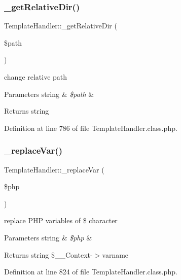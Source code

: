 \subsubsection{\texorpdfstring{\+\_\+get\+Relative\+Dir()}{\_getRelativeDir()}}
{\footnotesize\ttfamily Template\+Handler\+::\+\_\+get\+Relative\+Dir (\begin{DoxyParamCaption}\item[{}]{\$path }\end{DoxyParamCaption})}

change relative path 
\begin{DoxyParams}[1]{Parameters}
string & {\em \$path} & \\
\hline
\end{DoxyParams}
\begin{DoxyReturn}{Returns}
string 
\end{DoxyReturn}


Definition at line 786 of file Template\+Handler.\+class.\+php.

\hypertarget{classTemplateHandler_a10cb255c35e1e617f182e349b80cc335}{}\label{classTemplateHandler_a10cb255c35e1e617f182e349b80cc335} 
\subsubsection{\texorpdfstring{\+\_\+replace\+Var()}{\_replaceVar()}}
{\footnotesize\ttfamily Template\+Handler\+::\+\_\+replace\+Var (\begin{DoxyParamCaption}\item[{}]{\$php }\end{DoxyParamCaption})}

replace P\+HP variables of \$ character 
\begin{DoxyParams}[1]{Parameters}
string & {\em \$php} & \\
\hline
\end{DoxyParams}
\begin{DoxyReturn}{Returns}
string \$\+\_\+\+\_\+\+Context-\/$>$varname 
\end{DoxyReturn}


Definition at line 824 of file Template\+Handler.\+class.\+php.

\hypertarget{classTemplateHandler_aa3c14009a95a7258695563377f443e36}{}\label{classTemplateHandler_aa3c14009a95a7258695563377f443e36} 
